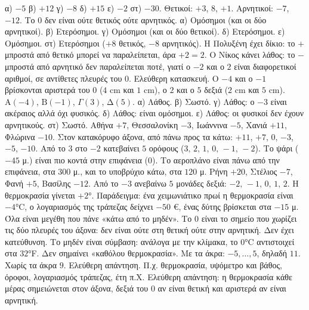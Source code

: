  α) $-5$ \quad β) $+12$ \quad γ) $-8$ \quad δ) $+15$ \quad ε) $-2$ \quad στ) $-30$.
 Θετικοί: $+3$, $8$, $+1$. Αρνητικοί: $-7$, $-12$. Το $0$ δεν είναι ούτε θετικός ούτε αρνητικός.
 α) Ομόσημοι (και οι δύο αρνητικοί). β) Ετερόσημοι. γ) Ομόσημοι (και οι δύο θετικοί). δ) Ετερόσημοι. ε) Ομόσημοι. στ) Ετερόσημοι ($+8$ θετικός, $-8$ αρνητικός).
 Η Πολυξένη έχει δίκιο: το $+$ μπροστά από θετικό μπορεί να παραλείπεται, άρα $+2=2$. Ο Νίκος κάνει λάθος: το $-$ μπροστά από αρνητικό δεν παραλείπεται ποτέ, γιατί ο $-2$ και ο $2$ είναι διαφορετικοί αριθμοί, σε αντίθετες πλευρές του $0$.
 Ελεύθερη κατασκευή. Ο $-4$ και ο $-1$ βρίσκονται αριστερά του $0$ ($4$ cm και $1$ cm), ο $2$ και ο $5$ δεξιά ($2$ cm και $5$ cm).
 $\mathrm{Α}(-4)$, $\mathrm{Β}(-1)$, $\Gamma(3)$, $\mathrm{Δ}(5)$.
 α) Λάθος. β) Σωστό. γ) Λάθος: ο $-3$ είναι ακέραιος αλλά όχι φυσικός. δ) Λάθος: είναι ομόσημοι. ε) Λάθος: οι φυσικοί δεν έχουν αρνητικούς. στ) Σωστό.
 Αθήνα $+7$, Θεσσαλονίκη $-3$, Ιωάννινα $-5$, Χανιά $+11$, Φλώρινα $-10$. Στον κατακόρυφο άξονα, από πάνω προς τα κάτω: $+11$, $+7$, $0$, $-3$, $-5$, $-10$.
 Από το $3$ στο $-2$ κατεβαίνει $5$ ορόφους ($3,\,2,\,1,\,0,\,-1,\,-2$).
 Το ψάρι ($-45$ μ.) είναι πιο κοντά στην επιφάνεια ($0$). Το αεροπλάνο είναι πάνω από την επιφάνεια, στα $300$ μ., και το υποβρύχιο κάτω, στα $120$ μ.
 Ρήνη $+20$, Στέλιος $-7$, Φανή $+5$, Βασίλης $-12$.
 Από το $-3$ ανεβαίνω $5$ μονάδες δεξιά: $-2,\,-1,\,0,\,1,\,2$. Η θερμοκρασία γίνεται $+2$°.
 Παράδειγμα: ένα χειμωνιάτικο πρωί η θερμοκρασία είναι $-4$°C, ο λογαριασμός της τράπεζας δείχνει $-50$ €, ένας δύτης βρίσκεται στα $-15$ μ. Όλα είναι μεγέθη που πάνε «κάτω από το μηδέν».
 Το $0$ είναι το σημείο που χωρίζει τις δύο πλευρές του άξονα: δεν είναι ούτε στη θετική ούτε στην αρνητική. Δεν έχει κατεύθυνση.
 Το μηδέν είναι σύμβαση: ανάλογα με την κλίμακα, το $0$°C αντιστοιχεί στα $32$°F. Δεν σημαίνει «καθόλου θερμοκρασία».
 Με τα άκρα: $-5,\dots,5$, δηλαδή $11$. Χωρίς τα άκρα $9$.
 Ελεύθερη απάντηση. Π.χ. θερμοκρασία, υψόμετρο και βάθος, όροφοι, λογαριασμός τράπεζας, έτη π.Χ.
 Ελεύθερη απάντηση: η θερμοκρασία κάθε μέρας σημειώνεται στον άξονα, δεξιά του $0$ αν είναι θετική και αριστερά αν είναι αρνητική.
